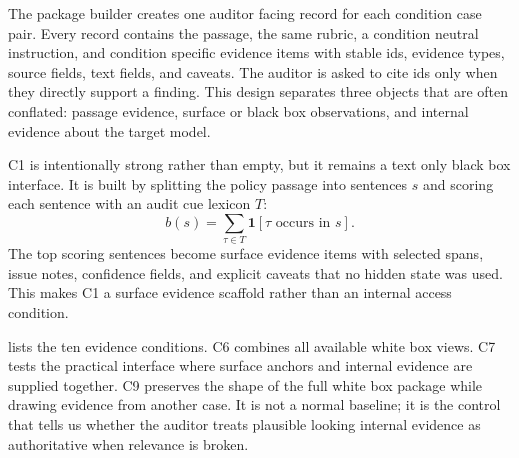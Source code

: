 \documentclass{article}
\begin{document}
The package builder creates one auditor facing record for each condition case pair. Every record contains the passage, the same rubric, a condition neutral instruction, and condition specific evidence items with stable ids, evidence types, source fields, text fields, and caveats. The auditor is asked to cite ids only when they directly support a finding. This design separates three objects that are often conflated: passage evidence, surface or black box observations, and internal evidence about the target model.

C1 is intentionally strong rather than empty, but it remains a text only black box interface. It is built by splitting the policy passage into sentences $s$ and scoring each sentence with an audit cue lexicon $T$:
\begin{equation}
b(s)=\sum_{\tau\in T}\mathbf{1}[\tau \text{ occurs in } s].
\end{equation}
The top scoring sentences become surface evidence items with selected spans, issue notes, confidence fields, and explicit caveats that no hidden state was used. This makes C1 a surface evidence scaffold rather than an internal access condition.

 lists the ten evidence conditions. C6 combines all available white box views. C7 tests the practical interface where surface anchors and internal evidence are supplied together. C9 preserves the shape of the full white box package while drawing evidence from another case. It is not a normal baseline; it is the control that tells us whether the auditor treats plausible looking internal evidence as authoritative when relevance is broken.
\end{document}
